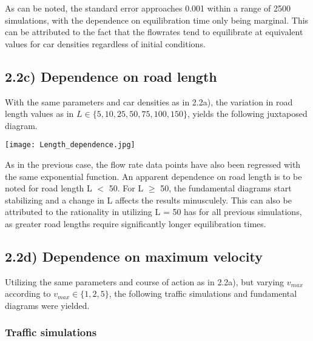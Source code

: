 \documentclass[12pt]{article}
\begin{document}
\noindent As can be noted, the standard error approaches 0.001 within a range of 2500 simulations, with the dependence on equilibration time only being marginal. This can be attributed to the fact that the flowrates tend to equilibrate at equivalent values for car densities regardless of initial conditions.

\subsection*{2.2c) Dependence on road length}
With the same parameters and car densities as in 2.2a), the variation in road length values as in $L \in \{5, 10, 25, 50, 75, 100, 150\}$,
yields the following juxtaposed diagram.
\begin{figure*}[ht!]
\begin{center}
    \texttt{[image: Length\_dependence.jpg]}
 \caption{}
\end{center}
\end{figure*}

\noindent As in the previous case, the flow rate data points have also been regressed with the same exponential function. 
\newpage
\noindent An apparent dependence on road length is to be noted for road length L $<$ 50. 
For L $\geq$ 50, the fundamental diagrams start stabilizing and a change in L affects the results minusculely.
This can also be attributed to the rationality in utilizing L = 50 has for all previous simulations, as greater road lengths require significantly longer equilibration times.

\subsection*{2.2d) Dependence on maximum velocity}
Utilizing the same parameters and course of action as in 2.2a), but varying $v_{max}$ according to 
$v_{max} \in \{1, 2, 5\}$, the following traffic simulations and fundamental diagrams were yielded.
\begin{figure*}[ht!]
\subsubsection*{Traffic simulations}
\begin{center}
   \subfloat[\label{genworkflow}]{%
      \texttt{[image: Traffic\_vmax=1.jpg]}}
   \subfloat[\label{pyramidprocess}]{%
      \texttt{[image: Traffic\_vmax=2.jpg]}}
   \subfloat[\label{mt-simtask}]{%
      \texttt{[image: Traffic\_vmax=5.jpg]}}\\
   \caption{\label{workflow} (a) $v_{max}=1$ (b) $v_{max}=2$ (c) $v_{max}=5$}
\end{center}
\end{figure*}
\end{document}
